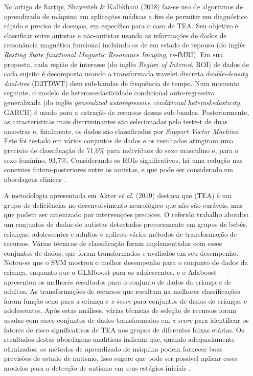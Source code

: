 \documentclass{template/sig-alternate-05-2015}
\begin{document}
No artigo de Sartipi, Shayesteh \& Kalbkhani (2018) faz-se uso de
algoritmos de aprendizado de máquina em aplicações médicas a fim de
permitir um diagnóstico rápido e preciso de doenças, em específico
para o caso de TEA. Seu objetivo é classificar entre autistas e
não-autistas usando as informações de dados de ressonância magnética
funcional incluindo os de em estado de repouso (do inglês
\textit{Resting State functional Magnetic Resonance Imaging},
rs-fMRI). Em sua proposta, cada região de interesse (do inglês
\textit{Region of Interest}, ROI) de dados de cada sujeito é
decomposta usando a transformada wavelet discreta
\textit{double-density dual-tree} (D3TDWT) dem sub-bandas de
frequência de tempo. Num momento seguinte, o modelo de
heteroscedasticidade condicional auto-regressiva generalizada (do
inglês \textit{generalized autoregressive conditional
  heteroskedasticity}, GARCH) é usado para a extração de recursos
dessas sub-bandas. Posteriormente, as características mais
discriminantes são selecionadas pelo teste-t de duas amostras e,
finalmente, os dados são classificados por \textit{Support Vector
  Machine}. Este foi testado em vários conjuntos de dados e os
resultados atingiram uma precisão de classificação de 71,6\% para
indivíduos do sexo masculino e, para o sexo feminino,
93,7\%. Considerando os ROIs significativos, há uma redução nas
conexões ântero-posteriores entre os autistas, e que pode ser
considerado em abordagens clínicas \cite{Sartipi:2018}.

A metodologia apresentada em Akter \textit{et al.} (2019) destaca que
(TEA) é um grupo de deficiências no desenvolvimento neurológico que
não são curáveis, mas que podem ser amenizado por intervenções
precoces. O referido trabalho abordou um conjuntos de dados de
autistas detectados precocemente em grupos de bebês, crianças,
adolescentes e adultos e aplicou vários métodos de transformação de
recursos. Várias técnicas de classificação foram implementadas com
esses conjuntos de dados, que foram transformados e avaliados em seu
desempenho. Notou-se que o SVM mostrou o melhor desempenho para o
conjunto de dados da criança, enquanto que o GLMboost para os
adolescentes, e o Adaboost apresentou os melhores resultados para o
conjunto de dados da criança e de adultos. As transformações de
recursos que resultam na melhores classificações foram função seno
para a criança e \textit{z-score} para conjuntos de dados de crianças
e adolescentes. Após estas análises, várias técnicas de seleção de
recursos foram usadas com esses conjuntos de dados transformados em
\textit{z-score} para identificar os fatores de risco significativos
de TEA nos grupos de diferentes faixas etárias. Os resultados destas
abordagens analíticas indicam que, quando adequadamente otimizados, os
métodos de aprendizado de máquina podem fornecer boas previsões de
estado de autismo. Isso sugere que pode ser possível aplicar esses
modelos para a detecção de autismo em seus estágios iniciais
\cite{Akter:2019}.
\end{document}
